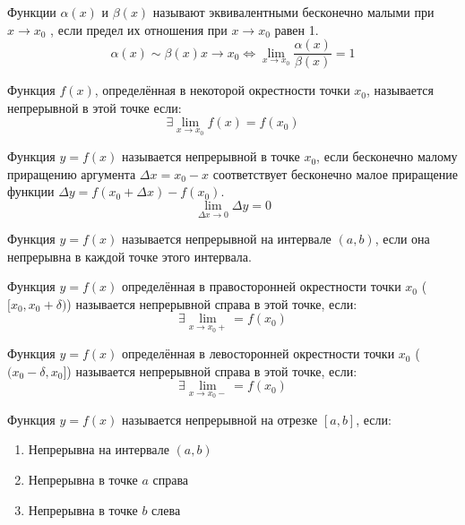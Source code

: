 \begin{definition} \label{def:44}
    Функции $\alpha(x)$ и $\beta(x)$ называют эквивалентными бесконечно малыми при $x \to x_0$ , если предел их отношения при $x \to x_0$ равен 1. \[
        \alpha(x) \sim \beta(x) x \to x_0 \iff \lim_{x \to x_0} \frac{\alpha(x)}{\beta(x)} = 1
    \]
\end{definition}


\begin{definition} \label{def:50}
    Функция $f(x)$, определённая в некоторой окрестности точки $x_0$, называется непрерывной в этой точке если: \[
        \exists \lim_{x \to x_0} f(x) = f(x_0)
    \]
\end{definition}


\begin{definition} \label{def:51}
    Функция $y = f(x)$ называется непрерывной в точке $x_0$, если бесконечно малому приращению аргумента $\Delta x = x_0 - x$  соответствует бесконечно малое приращение функции $\Delta y = f(x_0 + \Delta x) - f(x_0)$. \[
        \lim_{\Delta x \to 0} \Delta y = 0
    \] 
\end{definition}


\begin{definition} \label{def:54}
    Функция $y = f(x)$ называется непрерывной на интервале $(a, b)$, если она непрерывна в каждой точке этого интервала.
\end{definition}


\begin{definition}
    Функция $y = f(x)$ определённая в правосторонней окрестности точки $x_0$ ($[x_0, x_0 + \delta)$) называется непрерывной справа в этой точке, если: \[
        \exists \lim_{x \to x_0+} = f(x_0)
    \] 
\end{definition}


\begin{definition}
    Функция $y = f(x)$ определённая в левосторонней окрестности точки $x_0$ ($(x_0 - \delta, x_0]$) называется непрерывной справа в этой точке, если: \[
        \exists \lim_{x \to x_0-} = f(x_0)
    \] 
\end{definition}


\begin{definition} \label{def:55}
    Функция $y = f(x) $ называется непрерывной на отрезке $[a, b]$, если:
    \begin{enumerate}
        \item Непрерывна на интервале $(a, b)$
        \item Непрерывна в точке $a$ справа
        \item Непрерывна в точке $b$ слева
    \end{enumerate}
\end{definition}


